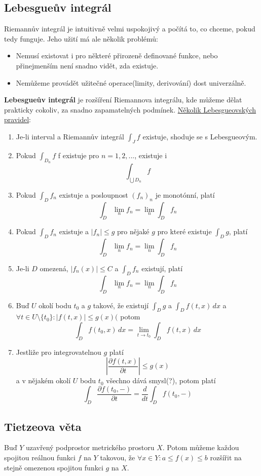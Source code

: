 \documentclass[../main.tex]{subfiles}
\begin{document}
\subsection{Lebesgueův integrál}
\hspace{1.2mm}
Riemannův integrál je intuitivně velmi uspokojivý a počítá to, co chceme, pokud tedy funguje.
Jeho užití má ale několik problémů:
\begin{itemize}
    \item Nemusí existovat i pro některé přirozeně definované funkce, nebo
    přinejmenším není snadno vidět, zda existuje.
    \item Nemůžeme provádět užitečné operace(limity, derivování) dost univerzálně.
\end{itemize}
\textbf{Lebesgueův integrál} je rozšíření Riemannova integrálu, kde můžeme dělat prakticky cokoliv,
za snadno zapamatelných podmínek.
\underline{Několik Lebesgueovských pravidel}:
\begin{enumerate}
    \item Je-li interval a Riemannův integrál $\int_{J} f$ existuje, shoduje se s Lebesgueovým.
    \item Pokud $ \int_{D_n} f $ f existuje pro $n = 1, 2, ...$, existuje i \[\int_{\bigcup D_n} f\]
    \item Pokud $ \int_{D} f_n $ existuje a posloupnost $(f_n)_n$ je monotónní, platí
    \[ \int_D \lim_n f_n = \lim_n \int_D f_n \]
    \item Pokud $\int_D f_n$ existuje a $|f_n|\leq g$ pro nějaké $g$ pro které existuje
    $\int_D g$, platí
    \[ \int_D \lim_n f_n = \lim_n \int_D f_n \]
    \item Je-li $D$ omezená, $|f_n(x)| \leq C$ a $\int_D f_n$ existují, platí
    \[ \int_D \lim_n f_n = \lim_n \int_D f_n \]
    \item Buď $U$ okolí bodu $t_0$ a $g$ takové, že existují $\int_D g$ a $\int_D f(t,x)\,dx$ a
    $\forall t \in U\textrm{\textbackslash}\{t_0\}: |f(t,x)|\leq g(x)($ potom
    \[ \int_D f(t_0, x)\,dx = \lim_{t\to t_0} \int_D f(t,x)\,dx \]
    \item Jestliže pro integrovatelnou $g$ platí
    \[ \left| \frac{\partial f(t,x)}{\partial t} \right| \leq g(x) \]
    a v nějakém okolí $U$ bodu $t_0$ všechno dává smysl(?), potom platí
    \[ \int_D \frac{\partial f(t_0,-)}{\partial t} = \frac{d}{dt} \int_D f(t_0, -)\]
\end{enumerate}


\subsection{Tietzeova věta}
\hspace{1.2mm}
Buď $Y$ uzavřený podprostor metrického prostoru $X$. Potom můžeme každou spojitou reálnou
funkci $f$ na $Y$ takovou, že $\forall x \in Y: a \leq f(x) \leq b$ rozšířit na stejně omezenou
spojitou funkci $g$ na $X$.
\end{document}
